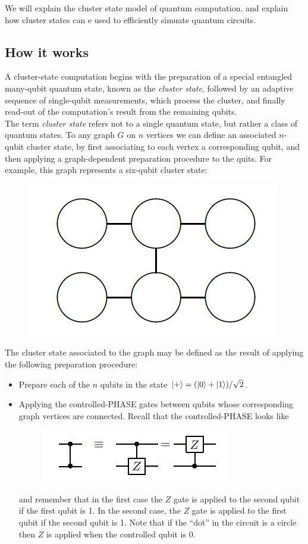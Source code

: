 \documentclass{book}
\theoremstyle{definition}
\begin{document}
We will explain the cluster state model of quantum computation, and explain how cluster states can e used to efficiently simuate quantum circuits. 

\subsection{How it works}


A cluster-state computation begins with the preparation of a special entangled many-qubit quantum state, known as the \textit{cluster state}, followed by an adaptive sequence of single-qubit measurements, which process the cluster, and finally read-out of the computation's result from the remaining qubits. \\

The term \textit{cluster state} refers not to a single quantum state, but rather a class of quantum states. To any graph $G$ on $n$ vertices we can define an associated $n$-qubit cluster state, by first associating to each vertex a corresponding qubit, and then applying a graph-dependent preparation procedure to the quits. For example, this graph represents a six-qubit cluster state:
\begin{figure}[!htb]
	\centering
	\includegraphics[scale=0.3]{cluster1}
\end{figure}
The cluster state associated to the graph may be defined as the result of applying the following preparation procedure:
\begin{itemize}
	\item Prepare each of the $n$ qubits in the state $\ket{+} = (\ket{0} + \ket{1})/\sqrt{2}$.
	
	\item Applying the controlled-PHASE gates between qubits whose corresponding graph vertices are connected. Recall that the controlled-PHASE looks like
	\begin{figure}[!htb]
		\centering
		\includegraphics[scale=0.5]{cphase}
	\end{figure}
	and remember that in the first case the $Z$ gate is applied to the second qubit if the first qubit is 1. In the second case, the $Z$ gate is applied to the first qubit if the second qubit is 1. Note that if the ``dot'' in the circuit is a circle then $Z$ is applied when the controlled qubit is 0.
\end{itemize}
\end{document}
